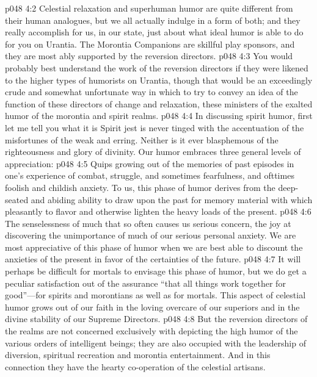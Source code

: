 \vs p048 4:2 Celestial relaxation and superhuman humor are quite different from their human analogues, but we all actually indulge in a form of both; and they really accomplish for us, in our state, just about what ideal humor is able to do for you on Urantia. The Morontia Companions are skillful play sponsors, and they are most ably supported by the reversion directors.
\vs p048 4:3 You would probably best understand the work of the reversion directors if they were likened to the higher types of humorists on Urantia, though that would be an exceedingly crude and somewhat unfortunate way in which to try to convey an idea of the function of these directors of change and relaxation, these ministers of the exalted humor of the morontia and spirit realms.
\pc \vs p048 4:4 In discussing spirit humor, first let me tell you what it is  Spirit jest is never tinged with the accentuation of the misfortunes of the weak and erring. Neither is it ever blasphemous of the righteousness and glory of divinity. Our humor embraces three general levels of appreciation:
\pc \vs p048 4:5 \bibnobreakspace {} Quips growing out of the memories of past episodes in one’s experience of combat, struggle, and sometimes fearfulness, and ofttimes foolish and childish anxiety. To us, this phase of humor derives from the deep\hyp{}seated and abiding ability to draw upon the past for memory material with which pleasantly to flavor and otherwise lighten the heavy loads of the present.\plusone
\pc \vs p048 4:6 \bibnobreakspace {} The senselessness of much that so often causes us serious concern, the joy at discovering the unimportance of much of our serious personal anxiety. We are most appreciative of this phase of humor when we are best able to discount the anxieties of the present in favor of the certainties of the future.
\pc \vs p048 4:7 \bibnobreakspace {} It will perhaps be difficult for mortals to envisage this phase of humor, but we do get a peculiar satisfaction out of the assurance “that all things work together for good”---for spirits and morontians as well as for mortals. This aspect of celestial humor grows out of our faith in the loving overcare of our superiors and in the divine stability of our Supreme Directors.
\pc \vs p048 4:8 But the reversion directors of the realms are not concerned exclusively with depicting the high humor of the various orders of intelligent beings; they are also occupied with the leadership of diversion, spiritual recreation and morontia entertainment. And in this connection they have the hearty co\hyp{}operation of the celestial artisans.
